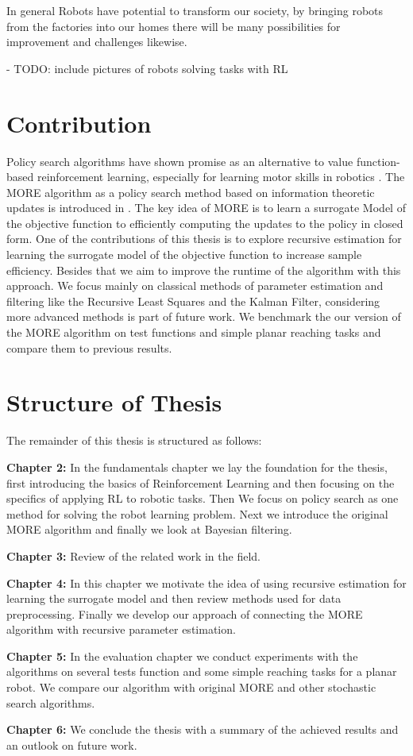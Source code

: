 In general Robots have potential to transform our society, by
bringing robots from the factories into our homes there will be many
possibilities for improvement and challenges likewise.

- TODO: include pictures of robots solving tasks with RL


\section{Contribution}
Policy search algorithms have shown promise as an alternative
to value function-based reinforcement learning, especially for learning motor
skills in robotics \citet{deisenroth2013survey}.
The MORE algorithm as a policy search method based on
information theoretic updates is introduced in \citet{abdolmaleki2015model}.
The key idea of MORE is to learn a surrogate Model of
the objective function to efficiently computing the updates to
the policy in closed form. One of
the contributions of this thesis is to explore recursive estimation 
for learning the surrogate model of the objective function to increase
sample efficiency. Besides that we aim to improve the  runtime of
the algorithm with this approach.
We focus mainly on classical methods of parameter estimation and filtering
like the Recursive Least Squares and the Kalman Filter,
considering more advanced methods is part of future work.
We benchmark the our version of the MORE algorithm on test functions and
simple planar reaching tasks and compare
them to previous results.

\section{Structure of Thesis}
The remainder of this thesis is structured as follows:

\textbf{Chapter 2:} In the fundamentals chapter we lay the foundation for
the thesis, first introducing the basics of Reinforcement Learning and
then focusing on the specifics of applying RL to robotic
tasks.
Then We focus on policy
search as one method for solving the robot learning problem.
Next we introduce the original MORE algorithm and finally
we look at Bayesian filtering.

\textbf{Chapter 3:} Review of the related work in the field.

\textbf{Chapter 4:} In this chapter we motivate the idea of
using recursive estimation for learning the surrogate model
and then review methods used for data preprocessing.
Finally we develop our approach of  connecting
the MORE algorithm with recursive parameter estimation. 

\textbf{Chapter 5:} In the evaluation chapter we conduct experiments
with the algorithms on several tests function and some simple reaching tasks
for a planar robot. We compare our algorithm with original MORE and
other stochastic search algorithms.

\textbf{Chapter 6:} We conclude the thesis with a summary of
the achieved results and an outlook on future work.